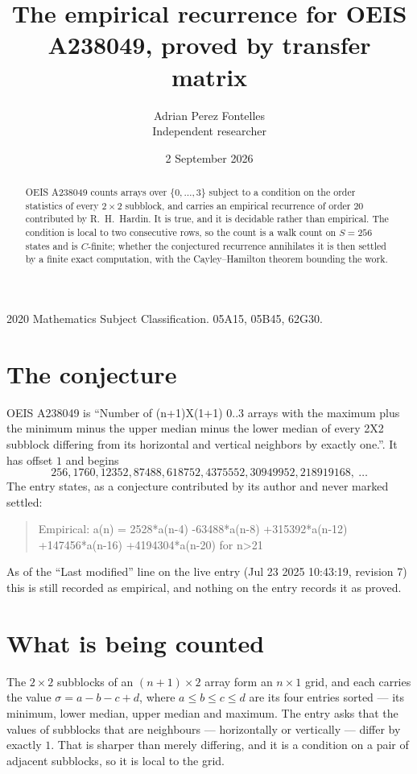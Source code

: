 \documentclass[11pt,a4paper]{article}
\title{The empirical recurrence for OEIS A238049, proved by transfer matrix}
\author{Adrian Perez Fontelles\\ \small Independent researcher}
\date{2 September 2026}
\theoremstyle{plain}
\theoremstyle{definition}
\begin{document}
\maketitle

\begin{abstract}
OEIS A238049 counts arrays over $\{0,\dots,3\}$ subject to a condition on the order
statistics of every $2\times2$ subblock, and carries an empirical recurrence of order
$20$ contributed by R.~H.~Hardin. It is true, and it is decidable rather than empirical.
The condition is local to two consecutive rows, so the count is a walk count on $S=256$
states and is $C$-finite; whether the conjectured recurrence annihilates it is then settled by
a finite exact computation, with the Cayley--Hamilton theorem bounding the work.
\end{abstract}

\noindent\small 2020 Mathematics Subject Classification. 05A15, 05B45, 62G30.\normalsize

\section{The conjecture}

OEIS A238049 is ``Number of (n+1)X(1+1) 0..3 arrays with the maximum plus the minimum minus the upper median minus the lower median of every 2X2 subblock differing from its horizontal and vertical neighbors by exactly one.''. It has offset $1$ and begins
\[
256, 1760, 12352, 87488, 618752, 4375552, 30949952, 218919168,\ \dots
\]
The entry states, as a conjecture contributed by its author and never marked settled:
\begin{quote}
Empirical: a(n) = 2528*a(n-4) -63488*a(n-8) +315392*a(n-12) +147456*a(n-16) +4194304*a(n-20) for n>21
\end{quote}
As of the ``Last modified'' line on the live entry (Jul 23 2025 10:43:19, revision 7) this is still
recorded as empirical, and nothing on the entry records it as proved.

\section{What is being counted}

The $2\times2$ subblocks of an $(n+1)\times2$ array form an
$n\times1$ grid, and each carries the value $\sigma=a-b-c+d$, where $a\le b\le c\le d$ are its four entries sorted --- its minimum, lower median, upper median and maximum. The entry asks that the values of
subblocks that are neighbours --- horizontally or vertically --- differ by exactly $1$.
That is sharper than merely differing, and it is a condition on a pair of adjacent subblocks,
so it is local to the grid.
\end{document}
